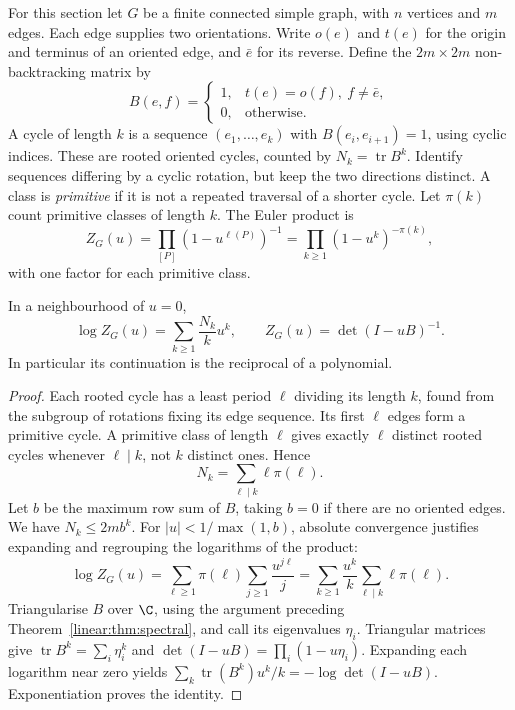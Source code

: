 For this section let $G$ be a finite connected simple graph, with $n$ vertices and $m$ edges. Each edge supplies two orientations. Write $o(e)$ and $t(e)$ for the origin and terminus of an oriented edge, and $\bar e$ for its reverse. Define the $2m\times2m$ non-backtracking matrix by
\[
B(e,f)=\begin{cases}1,&t(e)=o(f),\ f\ne\bar e,\\0,&\text{otherwise}.\end{cases}
\]
A cycle of length $k$ is a sequence $(e_1,\ldots,e_k)$ with $B(e_i,e_{i+1})=1$, using cyclic indices. These are rooted oriented cycles, counted by $N_k=\operatorname{tr}B^k$. Identify sequences differing by a cyclic rotation, but keep the two directions distinct. A class is \emph{primitive} if it is not a repeated traversal of a shorter cycle. Let $\pi(k)$ count primitive classes of length $k$. The Euler product is
\[
Z_G(u)=\prod_{[P]}(1-u^{\ell(P)})^{-1}
=\prod_{k\ge1}(1-u^k)^{-\pi(k)},
\]
with one factor for each primitive class.

\begin{proposition}\label{prop:iharadet}
In a neighbourhood of $u=0$,
\[
\log Z_G(u)=\sum_{k\ge1}\frac{N_k}{k}u^k,\qquad
Z_G(u)=\det(I-uB)^{-1}.
\]
In particular its continuation is the reciprocal of a polynomial.
\end{proposition}
\begin{proof}
Each rooted cycle has a least period $\ell$ dividing its length $k$, found from the subgroup of rotations fixing its edge sequence. Its first $\ell$ edges form a primitive cycle. A primitive class of length $\ell$ gives exactly $\ell$ distinct rooted cycles whenever $\ell\mid k$, not $k$ distinct ones. Hence
\begin{equation}\label{eq:nkpi}
N_k=\sum_{\ell\mid k}\ell\pi(\ell).
\end{equation}
Let $b$ be the maximum row sum of $B$, taking $b=0$ if there are no oriented edges. We have $N_k\le2m b^k$. For $|u|<1/\max(1,b)$, absolute convergence justifies expanding and regrouping the logarithms of the product:
\[
\log Z_G(u)=\sum_{\ell\ge1}\pi(\ell)\sum_{j\ge1}\frac{u^{j\ell}}j
=\sum_{k\ge1}\frac{u^k}{k}\sum_{\ell\mid k}\ell\pi(\ell).
\]
Triangularise $B$ over $\C$, using the argument preceding Theorem~\ref{linear:thm:spectral}, and call its eigenvalues $\eta_i$. Triangular matrices give $\operatorname{tr}B^k=\sum_i\eta_i^k$ and $\det(I-uB)=\prod_i(1-u\eta_i)$. Expanding each logarithm near zero yields
$\sum_k\operatorname{tr}(B^k)u^k/k=-\log\det(I-uB)$.
Exponentiation proves the identity.
\end{proof}

